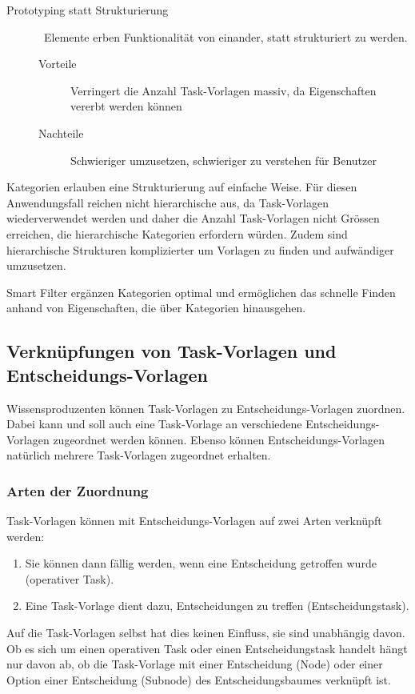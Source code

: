 {{\begin{description}
					\item[Prototyping statt Strukturierung] \
						Elemente erben Funktionalität von einander, statt strukturiert zu werden.
						\begin{description}
							\item[Vorteile] Verringert die Anzahl Task-Vorlagen massiv, da Eigenschaften vererbt werden können
							\item[Nachteile] Schwieriger umzusetzen, schwieriger zu verstehen für Benutzer
						\end{description}					
				\end{description}
			}
			{
				Kategorien erlauben eine Strukturierung auf einfache Weise. 
				Für diesen Anwendungsfall reichen nicht hierarchische aus, 
				da Task-Vorlagen wiederverwendet werden und daher die Anzahl Task-Vorlagen nicht Grössen erreichen, 
				die hierarchische Kategorien erfordern würden. 
				Zudem sind hierarchische Strukturen komplizierter um Vorlagen zu finden und aufwändiger umzusetzen.
				
				Smart Filter ergänzen Kategorien optimal und ermöglichen das schnelle Finden anhand von Eigenschaften,
				die über Kategorien hinausgehen.
			}
			{}
			{}
			{}
		}
		
		
		\subsection{Verknüpfungen von Task-Vorlagen und Entscheidungs-Vorlagen}
			Wissensproduzenten können Task-Vorlagen zu Entscheidungs-Vorlagen zuordnen.
			Dabei kann und soll auch eine Task-Vorlage an verschiedene Entscheidungs-Vorlagen zugeordnet werden können.
			Ebenso können Entscheidungs-Vorlagen natürlich mehrere Task-Vorlagen zugeordnet erhalten.
			
			\subsubsection{Arten der Zuordnung}
				Task-Vorlagen können mit Entscheidungs-Vorlagen auf zwei Arten verknüpft werden:
				\begin{enumerate}
					\item Sie können dann fällig werden, wenn eine Entscheidung getroffen wurde (operativer Task).
					\item Eine Task-Vorlage dient dazu, Entscheidungen zu treffen (Entscheidungstask).
				\end{enumerate}
				Auf die Task-Vorlagen selbst hat dies keinen Einfluss, sie sind unabhängig davon. 
				Ob es sich um einen operativen Task oder einen Entscheidungstask handelt hängt nur davon ab,
				ob die Task-Vorlage mit einer Entscheidung (Node) oder einer Option einer Entscheidung (Subnode) des Entscheidungsbaumes verknüpft ist.

